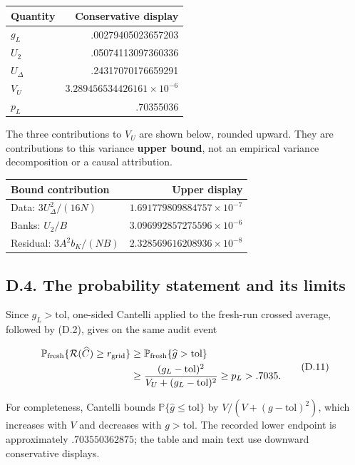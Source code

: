 \documentclass{article}
\begin{document}
\begin{longtable}[]{@{}lr@{}}
\toprule\noalign{}
Quantity & Conservative display \\
\midrule\noalign{}
\endhead
\bottomrule\noalign{}
\endlastfoot
\(g_L\) & .00279405023657203 \\
\(U_2\) & .05074113097360336 \\
\(U_\Delta\) & .24317070176659291 \\
\(V_U\) & \(3.289456534426161\times10^{-6}\) \\
\(p_L\) & .70355036 \\
\end{longtable}

The three contributions to \(V_U\) are shown below, rounded upward. They
are contributions to this variance \textbf{upper bound}, not an
empirical variance decomposition or a causal attribution.

\begin{longtable}[]{@{}lr@{}}
\toprule\noalign{}
Bound contribution & Upper display \\
\midrule\noalign{}
\endhead
\bottomrule\noalign{}
\endlastfoot
Data: \(3U_\Delta^2/(16N)\) & \(1.691779809884757\times10^{-7}\) \\
Banks: \(U_2/B\) & \(3.096992857275596\times10^{-6}\) \\
Residual: \(3A^2b_K/(NB)\) & \(2.328569616208936\times10^{-8}\) \\
\end{longtable}

\subsection*{D.4. The probability statement and its
limits}\label{d.4.-the-probability-statement-and-its-limits}

Since \(g_L>\mathrm{tol}\), one-sided Cantelli applied to the fresh-run
crossed average, followed by (D.2), gives on the same audit event

\[
\begin{aligned}
\mathbb P_{\rm fresh}\{\mathcal R(\widehat C)\ge r_{\rm grid}\}
&\ge\mathbb P_{\rm fresh}\{\widehat g>\mathrm{tol}\}\\
&\ge\frac{(g_L-\mathrm{tol})^2}{V_U+(g_L-\mathrm{tol})^2}
\ge p_L>.7035.
\end{aligned}
\tag{D.11}
\]

For completeness, Cantelli bounds
\(\mathbb P\{\widehat g\le\mathrm{tol}\}\) by
\(V/(V+(g-\mathrm{tol})^2)\), which increases with \(V\) and decreases
with \(g>\mathrm{tol}\). The recorded lower endpoint is approximately
\(.703550362875\); the table and main text use downward conservative
displays.
\end{document}
